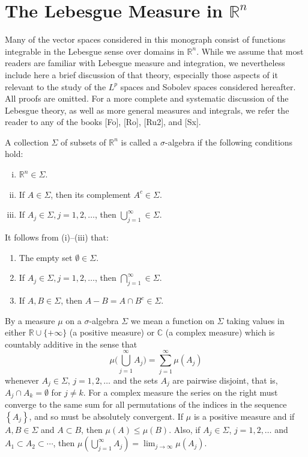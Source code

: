\section{The Lebesgue Measure in $\mathbb{R}^n$}


\begin{para}
  Many of the vector spaces considered in this monograph consist of functions integrable in the Lebesgue sense over domains in $\mathbb{R}^n$. While we assume that most readers are familiar with Lebesgue measure and integration, we nevertheless include here a brief discussion of that theory, especially those aspects of it relevant to the study of the $L^p$ spaces and Sobolev spaces considered hereafter. All proofs are omitted. For a more complete and systematic discussion of the Lebesgue theory, as well as more general measures and integrals, we refer the reader to any of the books [Fo], [Ro], [Ru2], and [Sx].
\end{para}


\begin{para}
  A collection $\Sigma$ of subsets of $\mathbb{R}^n$ is called a $\sigma$-algebra if the following conditions hold:
  \begin{enumerate}[(i)]
    \item $\mathbb{R}^n \in \Sigma$.
    \item If $A \in \Sigma$, then its complement $A^c \in \Sigma$.
    \item If $A_j \in \Sigma, j=1,2, \ldots$, then $\bigcup_{j=1}^{\infty} \in \Sigma$.
  \end{enumerate}
  It follows from (i)--(iii) that:
  \begin{enumerate}[resume,label = (\roman*)]
    \item The empty set $\emptyset \in \Sigma$.
    \item If $A_j \in \Sigma, j=1,2, \ldots$, then $\bigcap_{j=1}^{\infty} \in \Sigma$.
    \item If $A, B \in \Sigma$, then $A-B=A \cap B^c \in \Sigma$.
  \end{enumerate}
\end{para}


\begin{para}[Measures]
  By a measure $\mu$ on a $\sigma$-algebra $\Sigma$ we mean a function on $\Sigma$ taking values in either $\mathbb{R} \cup\{+\infty\}$ (a positive measure) or $\mathbb{C}$ (a complex measure) which is countably additive in the sense that
  \[
  \mu\biggl(\bigcup_{j=1}^{\infty} A_j\biggr)=\sum_{j=1}^{\infty} \mu\left(A_j\right)
  \]
  whenever $A_j \in \Sigma$, $j=1,2, \ldots$ and the sets $A_j$ are pairwise disjoint,
  that is, $A_j \cap A_k=\emptyset$ for $j \neq k$. For a complex measure the series on the right 
  must converge to the same sum for all permutations of the indices in the sequence
  $\left\{A_j\right\}$, and so must be absolutely convergent.
  If $\mu$ is a positive measure and if $A, B \in \Sigma$ and $A \subset B$,
  then $\mu(A) \leq \mu(B)$. Also, if $A_j \in \Sigma$, $j=1,2, \ldots$
  and $A_1 \subset A_2 \subset \cdots$, then $\mu\left(\bigcup_{j=1}^{\infty} A_j\right)=\lim_{j \rightarrow \infty} \mu\left(A_j\right)$.
\end{para}


